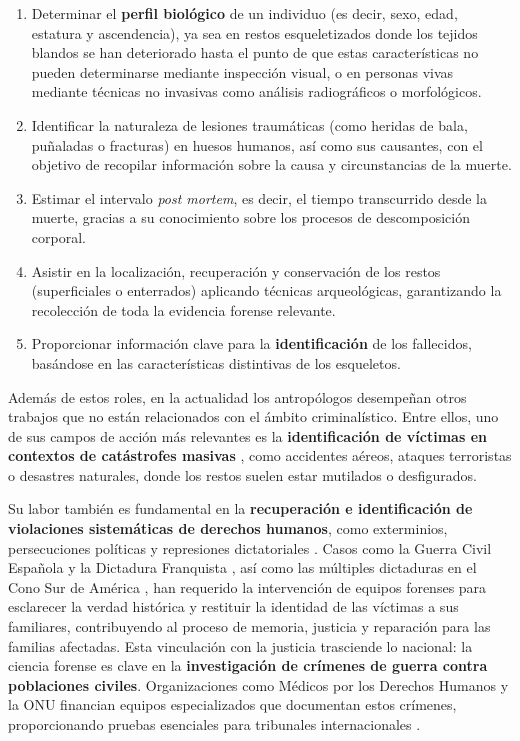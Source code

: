 \begin{enumerate}
    
    \item Determinar el \textbf{perfil biológico} de un individuo (es decir, sexo, edad, estatura y ascendencia), ya sea en restos esqueletizados donde los tejidos blandos se han deteriorado hasta el punto de que estas características no pueden determinarse mediante inspección visual, o en personas vivas mediante técnicas no invasivas como análisis radiográficos o morfológicos. 

    \item Identificar la naturaleza de lesiones traumáticas (como heridas de bala, puñaladas o fracturas) en huesos humanos, así como sus causantes, con el objetivo de recopilar información sobre la causa y circunstancias de la muerte.

    \item Estimar el intervalo \textit{post mortem}, es decir, el tiempo transcurrido desde la muerte, gracias a su conocimiento sobre los procesos de descomposición corporal.
    
    \item Asistir en la localización, recuperación y conservación de los restos (superficiales o enterrados) aplicando técnicas arqueológicas, garantizando la recolección de toda la evidencia forense relevante.

    \item Proporcionar información clave para la \textbf{identificación} de los fallecidos, basándose en las características distintivas de los esqueletos.

\end{enumerate}

Además de estos roles, en la actualidad los antropólogos desempeñan otros trabajos que no están relacionados con el ámbito criminalístico. Entre ellos, uno de sus campos de acción más relevantes es la \textbf{identificación de víctimas en contextos de catástrofes masivas} \cite{deBoer2019, prinz2007, beauthier2009}, como accidentes aéreos, ataques terroristas o desastres naturales, donde los restos suelen estar mutilados o desfigurados.

Su labor también es fundamental en la \textbf{recuperación e identificación de violaciones sistemáticas de derechos humanos}, como exterminios, persecuciones políticas y represiones dictatoriales \cite{skinner2003}. Casos como la Guerra Civil Española y la Dictadura Franquista \cite{sanchisgimeno2024, baeta2015}, así como las múltiples dictaduras en el Cono Sur de América \cite{ataliva2024}, han requerido la intervención de equipos forenses para esclarecer la verdad histórica y restituir la identidad de las víctimas a sus familiares, contribuyendo al proceso de memoria, justicia y reparación para las familias afectadas. Esta vinculación con la justicia trasciende lo nacional: la ciencia forense es clave en la \textbf{investigación de crímenes de guerra contra poblaciones civiles}. Organizaciones como Médicos por los Derechos Humanos y la ONU financian equipos especializados que documentan estos crímenes, proporcionando pruebas esenciales para tribunales internacionales \cite{tanaka2020}.

